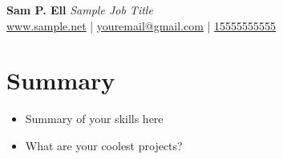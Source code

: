 \documentclass[11pt]{article} %
\begin{document}


\begin{center}
{\Large\bfseries Sam P. Ell} \emph{Sample Job Title}\\ %
\href{http://www.sample.net/}{www.sample.net} | \href{mailto:youremail@gmail.com}{youremail@gmail.com} | \href{tel:15555555555}{15555555555}
\end{center}




\section*{Summary}
\begin{itemize}
	\item Summary of your skills here
	\item What are your coolest projects?
\end{itemize}











%
%
%


\end{document}

